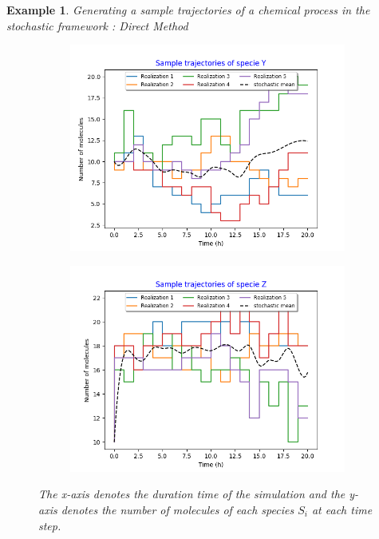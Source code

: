 \documentclass[11pt,a4paper]{article}
\newtheorem{example}[theorem]{Example}
\begin{document}
\begin{example}{Generating a sample trajectories of a chemical process in the stochastic framework : Direct Method}
\begin{figure}[!h]
    \centering
    \begin{subfigure}{.5\textwidth}
      \centering
        \includegraphics[width=1.1\linewidth]{Images/y_5.png}
        \label{fig: Single sample trajectory}
    \end{subfigure}%
    \begin{subfigure}{.5\textwidth}
      \centering
        \includegraphics[width=1.1\linewidth]{Images/z_5.png}
        \label{fig: Single sample trajectory}
    \end{subfigure}
    \caption{The x-axis denotes the duration time of the simulation and the y-axis denotes the number of molecules of each species $S_{i}$ at each time step.}
    \end{figure}
\end{example}
\end{document}
